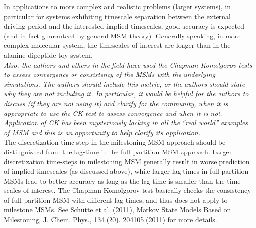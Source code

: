 \documentclass{article}
\begin{document}
In applications to more complex and realistic problems (larger systems), in particular for
systems exhibiting timescale separation between the external driving period and the interested implied
timescales, good accuracy is expected (and in fact guaranteed by general MSM theory). Generally speaking, in
more complex molecular system, the  timescales of interest are longer
than in the alanine dipeptide toy system. 
\\

\textit{ Also, the authors and others in the field have used the
  Chapman-Komolgorov tests to assess convergence or consistency of the
  MSMs with the underlying simulations.  The authors should include
  this metric, or the authors should state why they are not including
  it.  In particular, it would be helpful for the authors to discuss
  (if they are not using it) and clarify for the community, when it is
  appropriate to use the CK test to assess convergence and when it is
  not. Application of CK has been mysteriously lacking in all the
  “real world” examples of MSM and this is an opportunity to help
  clarify its application.
}\\

The discretization time-step in the milestoning MSM approach should be
distinguished from the lag-time in the full partition MSM
approach. Larger discretization time-steps in milestoning MSM generally result in
worse prediction of implied timescales (as discussed above), while larger lag-times in
full partition MSMs lead to better accuracy as long as the
lag-time is smaller than the time-scales of interest. The
Chapman-Komolgorov test basically checks the consistency of full
partition MSM with different lag-times, and thus does not apply to
milestone MSMs. See Schütte et al. (2011), Markov State Models Based on Milestoning, J. Chem. Phys., 134 (20). 204105 (2011) for more details.
\end{document}
